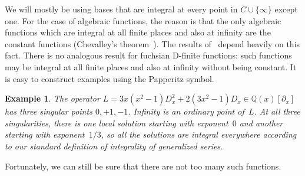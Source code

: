 \documentclass[final,1p,times,authoryear]{elsarticle}
\newtheorem{example}[theorem]{Example}
\let\set\mathbb
\begin{document}
We will mostly be using bases that are integral at every point in $\bar C\cup\{\infty\}$ except one.
For the case of algebraic functions, the reason is that the only algebraic functions which are
integral at all finite places and also at infinity are the constant functions (Chevalley's
theorem~\citep[p.~9, Cor.~3]{Chevalley1951}). The results of~\cite{chen16}
depend heavily on this fact. There is no analogous result for fuchsian D-finite functions: such
functions may be integral at all finite places and also at infinity without being constant.
It is easy to construct examples using the Papperitz symbol.

\begin{example}\label{example:integral-everywhere}
  The operator $L = 3 x(x^2-1) D_x^2 + 2 (3x^2 - 1) D_x\in\set Q(x)[\partial_x]$
  has three singular points $0,+1,-1$. Infinity is an ordinary point of~$L$.
  At all three singularities, there is one local solution starting with exponent~$0$
  and another starting with exponent~$1/3$, so all the solutions are integral
  everywhere according to our standard definition of integrality of generalized
  series.
\end{example}

Fortunately, we can still be sure that there are not too many such functions.
\end{document}
